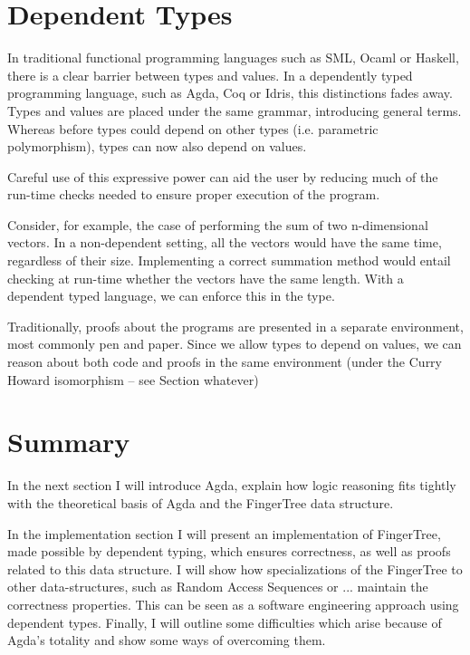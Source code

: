 \documentclass[12pt,twoside,notitlepage]{report}
\begin{document}
\section{Dependent Types}

In traditional functional programming languages such as SML, Ocaml or Haskell, there is a clear barrier between types and values. In a dependently typed programming language, such as Agda, Coq or Idris, this distinctions fades away. Types and values are placed under the same grammar, introducing general terms. Whereas before types could depend on other types (i.e. parametric polymorphism), types can now also depend on values.

Careful use of this expressive power can aid the user by reducing much of the run-time checks needed to ensure proper execution of the program. 

Consider, for example, the case of performing the sum of two n-dimensional vectors. In a non-dependent setting, all the vectors would have the same time, regardless of their size. Implementing a correct summation method would entail checking at run-time whether the vectors have the same length. With a dependent typed language, we can enforce this in the type.

Traditionally, proofs about the programs are presented in a separate environment, most commonly pen and paper. Since we allow types to depend on values, we can reason about both code and proofs in the same environment (under the Curry Howard isomorphism – see Section whatever)


\section{Summary}

In the next section I will introduce Agda, explain how logic reasoning fits tightly with the theoretical basis of Agda and the FingerTree data structure. 

In the implementation section I will present an implementation of FingerTree, made possible by dependent typing, which ensures correctness, as well as proofs related to this data structure. 
I will show how specializations of the FingerTree to other data-structures, such as Random Access Sequences or ... maintain the correctness properties. This can be seen as a software engineering approach using dependent types. 
Finally, I will outline some difficulties which arise because of Agda’s totality and show some ways of overcoming them.
\end{document}
